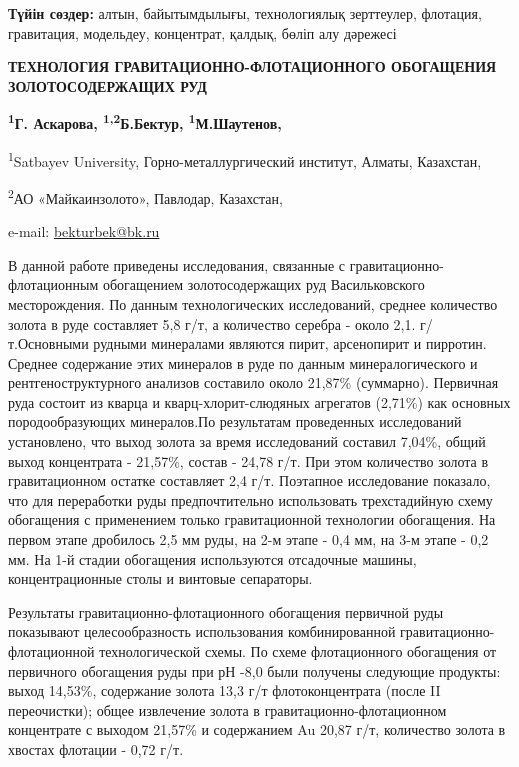 {\bfseries Түйін сөздер:} алтын, байытымдылығы, технологиялық зерттеулер,
флотация, гравитация, модельдеу, концентрат, қалдық, бөліп алу дәрежесі
\begin{articleheader}

{\bfseries ТЕХНОЛОГИЯ ГРАВИТАЦИОННО-ФЛОТАЦИОННОГО ОБОГАЩЕНИЯ
ЗОЛОТОСОДЕРЖАЩИХ РУД}

{\bfseries \textsuperscript{1}Г. Аскарова,
\textsuperscript{1,2}Б.Бектур\textsuperscript{\envelope },
  \textsuperscript{1}М.Шаутенов, }
\end{articleheader}
\begin{affiliation}
\textsuperscript{1}Satbayev University, Горно-металлургический институт,
Алматы, Казахстан,

\textsuperscript{2}АО «Майкаинзолото», Павлодар, Казахстан,

e-mail: \href{mailto:bekturbek@bk.run}{bekturbek@bk.ru}
\end{affiliation}

В данной работе приведены исследования, связанные с
гравитационно-флотационным обогащением золотосодержащих руд
Васильковского месторождения. По данным технологических исследований,
среднее количество золота в руде составляет 5,8 г/т, а количество
серебра - около 2,1. г/т.Основными рудными минералами являются пирит,
арсенопирит и пирротин. Среднее содержание этих минералов в руде по
данным минералогического и рентгеноструктурного анализов составило около
21,87\% (суммарно). Первичная руда состоит из кварца и
кварц-хлорит-слюдяных агрегатов (2,71\%) как основных породообразующих
минералов.По результатам проведенных исследований установлено, что выход
золота за время исследований составил 7,04\%, общий выход концентрата -
21,57\%, состав - 24,78 г/т. При этом количество золота в гравитационном
остатке составляет 2,4 г/т. Поэтапное исследование показало, что для
переработки руды предпочтительно использовать трехстадийную схему
обогащения с применением только гравитационной технологии обогащения. На
первом этапе дробилось 2,5 мм руды, на 2-м этапе - 0,4 мм, на 3-м этапе
- 0,2 мм. На 1-й стадии обогащения используются отсадочные машины,
концентрационные столы и винтовые сепараторы.

Результаты гравитационно-флотационного обогащения первичной руды
показывают целесообразность использования комбинированной
гравитационно-флотационной технологической схемы. По схеме флотационного
обогащения от первичного обогащения руды при рН -8,0 были получены
следующие продукты: выход 14,53\%, содержание золота 13,3 г/т
флотоконцентрата (после II переочистки); общее извлечение золота в
гравитационно-флотационном концентрате с выходом 21,57\% и содержанием
Au 20,87 г/т, количество золота в хвостах флотации - 0,72 г/т.


